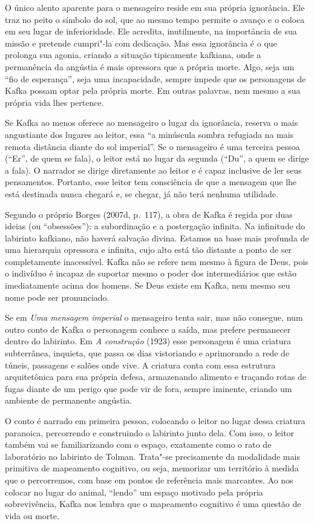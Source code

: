 O único alento aparente para o mensageiro reside em sua própria
ignorância. Ele traz no peito o símbolo do sol, que ao mesmo tempo
permite o avanço e o coloca em seu lugar de inferioridade. Ele acredita,
inutilmente, na importância de sua missão e pretende cumpri"-la com
dedicação. Mas essa ignorância é o que prolonga sua agonia, criando a
situação tipicamente kafkiana, onde a permanência da angústia é mais
opressora que a própria morte. Algo, seja um ``fio de esperança'', seja
uma incapacidade, sempre impede que os personagens de Kafka possam optar
pela própria morte. Em outras palavras, nem mesmo a sua própria vida
lhes pertence.

Se Kafka ao menos oferece ao mensageiro o lugar da ignorância, reserva o
mais angustiante dos lugares ao leitor, essa ``a minúscula sombra
refugiada na mais remota distância diante do sol imperial''. Se o
mensageiro é uma terceira pessoa (``Er'', de quem se fala), o leitor
está no lugar da segunda (``Du'', a quem se dirige a fala). O narrador
se dirige diretamente ao leitor e é capaz inclusive de ler seus
pensamentos. Portanto, esse leitor tem consciência de que a mensagem que
lhe está destinada nunca chegará e, se chegar, já não terá nenhuma
utilidade.

Segundo o próprio Borges (2007d, p.~117), a obra de Kafka é regida por
duas ideias (ou ``obsessões''): a subordinação e a postergação infinita.
Na infinitude do labirinto kafkiano, não haverá salvação divina. Estamos
na base mais profunda de uma hierarquia opressora e infinita, cujo alto
está tão distante a ponto de ser completamente inacessível. Kafka não se
refere nem mesmo à figura de Deus, pois o indivíduo é incapaz de
suportar mesmo o poder dos intermediários que estão imediatamente acima
dos homens. Se Deus existe em Kafka, nem mesmo seu nome pode ser
pronunciado.

Se em \emph{Uma mensagem imperial} o mensageiro tenta sair, mas não
consegue, num outro conto de Kafka o personagem conhece a saída, mas
prefere permanecer dentro do labirinto. Em \emph{A construção} (1923) \label{construcao}
esse personagem é uma criatura subterrânea, inquieta, que passa os dias
vistoriando e aprimorando a rede de túneis, passagens e salões onde
vive. A criatura conta com essa estrutura arquitetônica para sua própria
defesa, armazenando alimento e traçando rotas de fugas diante de um
perigo que pode vir de fora, sempre iminente, criando um ambiente de
permanente angústia.

O conto é narrado em primeira pessoa, colocando o leitor no lugar dessa
criatura paranoica, percorrendo e construindo o labirinto junto dela. Com
isso, o leitor também vai se familiarizando com o espaço, exatamente
como o rato de laboratório no labirinto de Tolman. Trata"-se precisamente
da modalidade mais primitiva de mapeamento cognitivo, ou seja, memorizar
um território à medida que o percorremos, com base em pontos de
referência mais marcantes. Ao nos colocar no lugar do animal, ``lendo''
um espaço motivado pela própria sobrevivência, Kafka nos lembra que o
mapeamento cognitivo é uma questão de vida ou morte.

